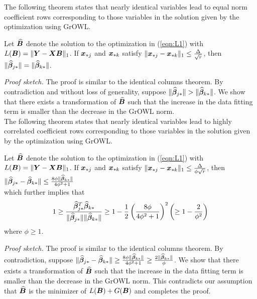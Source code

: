 The following theorem states that nearly identical variables lead to equal norm coefficient rows corresponding to those variables in the solution given by the optimization using GrOWL.
\begin{theorem}\label{thm2}
Let $\widehat {\boldsymbol{B}}$ denote the solution to the optimization in (\ref{eqn:L1}) with $L(\boldsymbol{B}) = \|\boldsymbol{Y} - \boldsymbol{X} \boldsymbol{B} \|_1$.
If $\boldsymbol{x}_{{\ast} j}$ and $\boldsymbol{x}_{{\ast} k}$ satisfy $\|\boldsymbol{x}_{{\ast} j} - \boldsymbol{x}_{{\ast} k}\|_1 \leq \frac{\Delta}{\sqrt{r}} $, then
$\|\widehat {\boldsymbol{\beta}}_{j {\ast}}\| = \|\widehat {\boldsymbol{\beta}}_{k {\ast}}\|$.

\end{theorem}
\textit{Proof sketch.}
The proof is similar to the identical columns theorem. By contradiction and without loss of generality, suppose $\|\widehat {\boldsymbol{\beta}}_{j {\ast}}\| > \|\widehat {\boldsymbol{\beta}}_{k {\ast}}\|$. We show that there exists a transformation of $\widehat{\boldsymbol{B}}$ such that the increase in the data fitting term is smaller than the decrease in the GrOWL norm. \\


The following theorem states that nearly identical variables lead to highly correlated coefficient rows corresponding to those variables in the solution given by the optimization using GrOWL.
\begin{theorem}\label{thm3}
Let $\widehat {\boldsymbol{B}}$ denote the solution to the optimization in (\ref{eqn:L1}) with $L(\boldsymbol{B}) = \|\boldsymbol{Y} - \boldsymbol{X} \boldsymbol{B} \|_1$.
If $\boldsymbol{x}_{{\ast} j}$ and $\boldsymbol{x}_{{\ast} k}$ satisfy $\|\boldsymbol{x}_{{\ast} j} - \boldsymbol{x}_{{\ast} k}\|_1 \leq \frac{\Delta}{\phi\sqrt{r}} $, then
$\|\widehat {\boldsymbol{\beta}}_{j {\ast}} - \widehat {\boldsymbol{\beta}}_{k {\ast}}\| \leq \frac{8\phi \|\widehat {\boldsymbol{\beta}}_{k {\ast}}\|}{4\phi^2+1}$ 
\\which further implies that 
$$1 \geq \frac{\widehat {\boldsymbol{\beta}}_{j {\ast}}^T \widehat {\boldsymbol{\beta}}_{k {\ast}}}{\|\widehat {\boldsymbol{\beta}}_{j {\ast}}\|\| \widehat {\boldsymbol{\beta}}_{k {\ast}}\|} \geq 1 - \frac{1}{2}\left( \frac{8\phi}{4\phi^2+1}\right)^2     \left( \geq 1 - \frac{2}{\phi^2}\right)$$ where $\phi \geq 1$.

\end{theorem}
\textit{Proof sketch.}
The proof is similar to the identical columns theorem. By contradiction, suppose $\|\widehat {\boldsymbol{\beta}}_{j {\ast}} - \widehat {\boldsymbol{\beta}}_{k {\ast}}\| \geq \frac{8\phi \|\widehat {\boldsymbol{\beta}}_{k {\ast}}\|}{4\phi^2+1}  \geq \frac{2 \|\widehat {\boldsymbol{\beta}}_{k {\ast}}\|}{\phi}$. We show that there exists a transformation of $\widehat{\boldsymbol{B}}$ such that the increase in the data fitting term is smaller than the decrease in the GrOWL norm. This contradicts our assumption that $\widehat{\boldsymbol{B}}$ is the minimizer of $L(\boldsymbol{B}) + G(\boldsymbol{B})$ and completes the proof.\\

